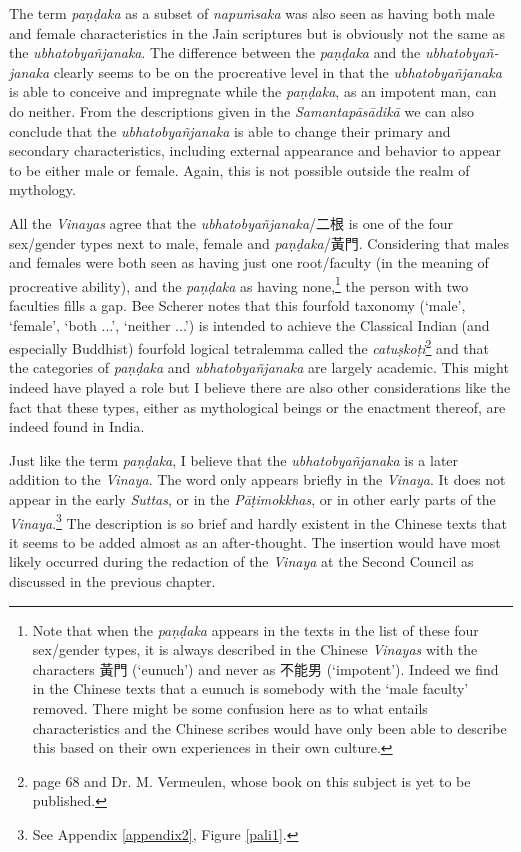 The term {\em paṇḍaka} as a subset of {\em napuṁsaka} was also seen as having both male and female characteristics in the Jain scriptures but is obviously not the same as the {\em ubhatob­yañ­janaka}. The difference between the {\em paṇḍaka} and the {\em ubhatob­yañ­janaka} clearly seems to be on the procreative level in that the {\em ubhatob­yañ­janaka} is able to conceive and impregnate while the {\em paṇḍaka}, as an impotent man, can do neither. From the descriptions given in the {\em Samantapāsādikā} we can also conclude that the {\em ubhatob­yañ­janaka} is able to change their primary and secondary characteristics, including external appearance and behavior to appear to be either male or female. Again, this is not possible outside the realm of mythology.

All the {\em Vinayas} agree that the {\em ubhatob­yañ­janaka}/二根 is one of the four sex/gender types next to male, female and {\em paṇḍaka}/黃門. Considering that males and females were both seen as having just one root/faculty (in the meaning of procreative ability), and the {\em paṇḍaka} as having none,\footnote{Note that when the {\em paṇḍaka} appears in the texts in the list of these four sex/gender types, it is always described in the Chinese {\em Vinayas} with the characters 黃門 (`eunuch') and never as 不能男 (`impotent'). Indeed we find in the Chinese texts that a eunuch is somebody with the `male faculty' removed. There might be some confusion here as to what entails characteristics and the Chinese scribes would have only been able to describe this based on their own experiences in their own culture.} the person with two faculties fills a gap. Bee Scherer notes that this fourfold taxonomy (`male', `female', `both ...', `neither ...') is intended to achieve the Classical Indian (and especially Buddhist) fourfold logical tetralemma called the {\em catuṣkoṭi}\footnote{\cite{scherer} page 68 and Dr. M. Vermeulen, whose book on this subject is yet to be published.} and that the categories of {\em paṇḍaka} and {\em ubhatob­yañ­janaka} are largely academic. This might indeed have played a role but I believe there are also other considerations like the fact that these types, either as mythological beings or the enactment thereof, are indeed found in India.

Just like the term {\em paṇḍaka}, I believe that the {\em ubhatob­yañ­janaka} is a later addition to the {\em Vinaya}. The word only appears briefly in the {\em Vinaya}. It does not appear in the early {\em Suttas}, or in the {\em Pāṭimokkhas}, or in other early parts of the {\em Vinaya}.\footnote{See Appendix \ref{appendix2}, Figure \ref{pali1}.} The description is so brief and hardly existent in the Chinese texts that it seems to be added almost as an after-thought. The insertion would have most likely occurred during the redaction of the {\em Vinaya} at the Second Council as discussed in the previous chapter.

